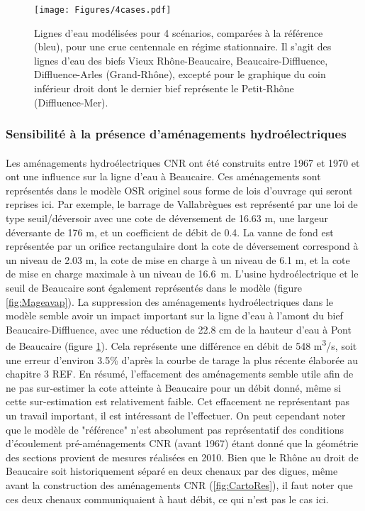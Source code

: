 \documentclass[11pt]{article}
\begin{document}
	\begin{figure}[h]
		\centering
		\texttt{[image: Figures/4cases.pdf]}
        \caption{Lignes d'eau modélisées pour 4 scénarios, comparées à la référence (bleu), pour une crue centennale en régime stationnaire. Il s'agit des lignes d'eau des biefs Vieux Rhône-Beaucaire, Beaucaire-Diffluence, Diffluence-Arles (Grand-Rhône), excepté pour le graphique du coin inférieur droit dont le dernier bief représente le Petit-Rhône (Diffluence-Mer).}
		\label{fig:Sensib4}
	\end{figure}		
				
\FloatBarrier	

	\subsubsection{Sensibilité à la présence d'aménagements hydroélectriques}
	
		\paragraph{} Les aménagements hydroélectriques CNR ont été construits entre 1967 et 1970 et ont une influence sur la ligne d'eau à Beaucaire. Ces aménagements sont représentés dans le modèle OSR originel \citep{launay_zabr-osr_2017} sous forme de lois d'ouvrage qui seront reprises ici. Par exemple, le barrage de Vallabrègues est représenté par une loi de type seuil/déversoir avec une cote de déversement de 16.63 m, une largeur déversante de 176 m, et un coefficient de débit de 0.4. La vanne de fond est représentée par un orifice rectangulaire dont la cote de déversement correspond à un niveau de 2.03 m, la cote de mise en charge à un niveau de 6.1 m, et la cote de mise en charge maximale à un niveau de 16.6~m. L'usine hydroélectrique et le seuil de Beaucaire sont également représentés dans le modèle (figure \ref{fig:Mageavap}). La suppression des aménagements hydroélectriques dans le modèle semble avoir un impact important sur la ligne d'eau à l'amont du bief Beaucaire-Diffluence, avec une réduction de 22.8 cm de la hauteur d'eau à Pont de Beaucaire (figure \ref{fig:Sensib4}). Cela représente une différence en débit de 548 m\textsuperscript{3}/s, soit une erreur d'environ 3.5\% d'après la courbe de tarage la plus récente élaborée au chapitre 3 REF. En résumé, l'effacement des aménagements semble utile afin de ne pas sur-estimer la cote atteinte à Beaucaire pour un débit donné, même si cette sur-estimation est relativement faible. Cet effacement ne représentant pas un travail important, il est intéressant de l'effectuer. On peut cependant noter que le modèle de "référence" n'est absolument pas représentatif des conditions d'écoulement pré-aménagements CNR (avant 1967) étant donné que la géométrie des sections provient de mesures réalisées en 2010. Bien que le Rhône au droit de Beaucaire soit historiquement séparé en deux chenaux par des digues, même avant la construction des aménagements CNR (\ref{fig:CartoRes}), il faut noter que ces deux chenaux communiquaient à haut débit, ce qui n'est pas le cas ici. 
		
\end{document}
